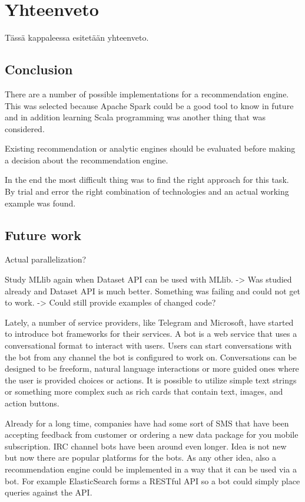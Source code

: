 \documentclass[main.tex]{thesis.tex}
\begin{document}
\chapter{Yhteenveto}

Tässä kappaleessa esitetään yhteenveto.

\section{Conclusion}

There are a number of possible implementations for a recommendation engine. This was selected because Apache Spark could be a good tool to know in future and in addition learning Scala programming was another thing that was considered.

Existing recommendation or analytic engines should be evaluated before making a decision about the recommendation engine.

In the end the most difficult thing was to find the right approach for this task. By trial and error the right combination of technologies and an actual working example was found.

\section{Future work}

Actual parallelization?

Study MLlib again when Dataset API can be used with MLlib. -> Was studied already and Dataset API is much better. Something was failing and could not get to work.
-> Could still provide examples of changed code?

Lately, a number of service providers, like Telegram and Microsoft, have started to introduce bot frameworks for their services. A bot is a web service that uses a conversational format to interact with users. Users can start conversations with the bot from any channel the bot is configured to work on. Conversations can be designed to be freeform, natural language interactions or more guided ones where the user is provided choices or actions. It is possible to utilize simple text strings or something more complex such as rich cards that contain text, images, and action buttons. \cite{bots16}

Already for a long time, companies have had some sort of SMS that have been accepting feedback from customer or ordering a new data package for you mobile subscription. IRC channel bots have been around even longer. Idea is not new but now there are popular platforms for the bots. As any other idea, also a recommendation engine could be implemented in a way that it can be used via a bot. For example ElasticSearch forms a RESTful API so a bot could simply place queries against the API.
\end{document}
